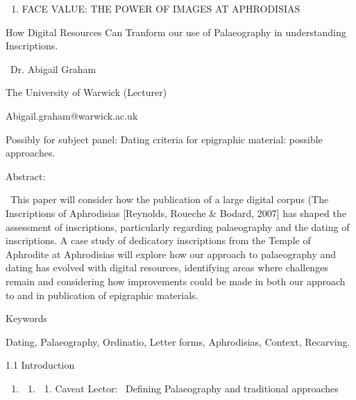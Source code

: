 \documentclass[amsthm,ebook]{saparticle}
\title{}
\author{Abigail S Graham}
\date{2015-11-16}
\begin{document}
\begin{enumerate}
\item FACE VALUE: THE POWER OF IMAGES AT APHRODISIAS
\end{enumerate}
How Digital Resources Can Tranform our use of Palaeography in understanding Inscriptions. 


\bigskip

\ Dr. Abigail Graham


\bigskip

The University of Warwick (Lecturer) 


\bigskip

Abigail.graham@warwick.ac.uk


\bigskip

Possibly for subject panel: Dating criteria for epigraphic material: possible approaches. 


\bigskip

Abstract: 


\bigskip

\ This paper will consider how the publication of a large digital corpus (The Inscriptions of Aphrodisias [Reynolds,
Roueche \& Bodard, 2007] has shaped the assessment of inscriptions, particularly regarding palaeography and the dating
of inscriptions. A case study of dedicatory inscriptions from the Temple of Aphrodite at Aphrodisias will explore how
our approach to palaeography and dating has evolved with digital resources, identifying areas where challenges remain
and considering how improvements could be made in both our approach to and in publication of epigraphic materials. 


\bigskip

Keywords


\bigskip

Dating, Palaeography, Ordinatio, Letter forms, Aphrodisias, Context, Recarving.


\bigskip


\bigskip

1.1 Introduction 


\bigskip

\begin{enumerate}
\item \begin{enumerate}
\item \begin{enumerate}
\item Caveat Lector: \ Defining Palaeography and traditional approaches
\end{enumerate}
\end{enumerate}
\end{enumerate}
\end{document}
